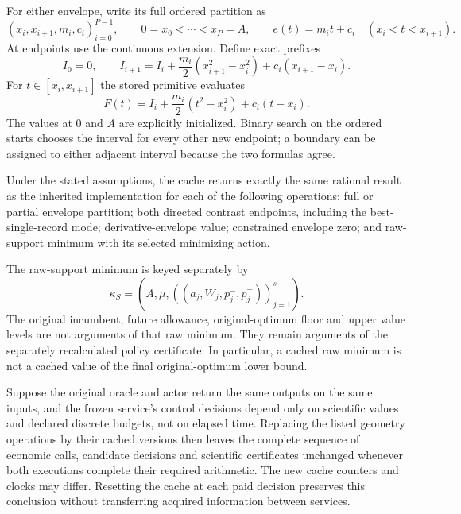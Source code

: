 For either envelope, write its full ordered partition as
\[
 (x_i,x_{i+1},m_i,c_i)_{i=0}^{P-1},\qquad
 0=x_0<\cdots<x_P=A,
 \qquad e(t)=m_it+c_i\quad(x_i<t<x_{i+1}).
\]
At endpoints use the continuous extension.  Define exact prefixes
\[
 I_0=0,\qquad
 I_{i+1}=I_i+\frac{m_i}{2}(x_{i+1}^2-x_i^2)
                              +c_i(x_{i+1}-x_i).
\]
For $t\in[x_i,x_{i+1}]$ the stored primitive evaluates
\begin{equation}\label{eq:cacheprimitive126c}
 F(t)=I_i+\frac{m_i}{2}(t^2-x_i^2)+c_i(t-x_i).
\end{equation}
The values at $0$ and $A$ are explicitly initialized.  Binary search on the
ordered starts chooses the interval for every other new endpoint; a boundary
can be assigned to either adjacent interval because the two formulas agree.

\begin{proposition}
\label{prop:cacheidentity126c}
Under the stated assumptions, the cache returns exactly the same rational
result as the inherited implementation for each of the following operations:
full or partial envelope partition; both directed contrast endpoints, including
the best-single-record mode; derivative-envelope value; constrained envelope
zero; and raw-support minimum with its selected minimizing action.

The raw-support minimum is keyed separately by
\[
 \kappa_S=(A,\mu,((a_j,W_j,p_j^-,p_j^+))_{j=1}^s).
\]
The original incumbent, future allowance, original-optimum floor and upper
value levels are not arguments of that raw minimum.  They remain arguments
of the separately recalculated policy certificate.  In particular, a cached
raw minimum is not a cached value of the final original-optimum lower bound.

Suppose the original oracle and actor return the same outputs on the same
inputs, and the frozen service's control decisions depend only on scientific
values and declared discrete budgets, not on elapsed time.  Replacing the
listed geometry operations by their cached versions then leaves the complete
sequence of economic calls, candidate decisions and scientific certificates
unchanged whenever both executions complete their required arithmetic.  The
new cache counters and clocks may differ.  Resetting the cache at each paid
decision preserves this conclusion without transferring acquired information
between services.
\end{proposition}

